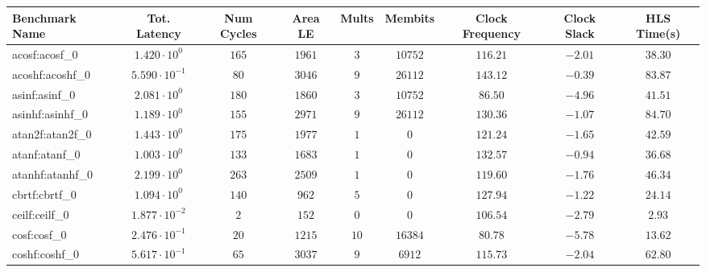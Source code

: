 \begin{tabular}{|l|c|c|c|c|c|c|c|c|}
\hline
Benchmark Name               & Tot. Latency            & Num Cycles & Area LE   & Mults   & Membits    & Clock Frequency & Clock Slack & HLS Time(s) \\
\hline
acosf:acosf\_0               & $ 1.420 \cdot 10^{0}  $ & $ 165    $ & $ 1961  $ & $ 3   $ & $ 10752  $ & $ 116.21      $ & $ -2.01   $ & $ 38.30   $ \\
acoshf:acoshf\_0             & $ 5.590 \cdot 10^{-1} $ & $ 80     $ & $ 3046  $ & $ 9   $ & $ 26112  $ & $ 143.12      $ & $ -0.39   $ & $ 83.87   $ \\
asinf:asinf\_0               & $ 2.081 \cdot 10^{0}  $ & $ 180    $ & $ 1860  $ & $ 3   $ & $ 10752  $ & $ 86.50       $ & $ -4.96   $ & $ 41.51   $ \\
asinhf:asinhf\_0             & $ 1.189 \cdot 10^{0}  $ & $ 155    $ & $ 2971  $ & $ 9   $ & $ 26112  $ & $ 130.36      $ & $ -1.07   $ & $ 84.70   $ \\
atan2f:atan2f\_0             & $ 1.443 \cdot 10^{0}  $ & $ 175    $ & $ 1977  $ & $ 1   $ & $ 0      $ & $ 121.24      $ & $ -1.65   $ & $ 42.59   $ \\
atanf:atanf\_0               & $ 1.003 \cdot 10^{0}  $ & $ 133    $ & $ 1683  $ & $ 1   $ & $ 0      $ & $ 132.57      $ & $ -0.94   $ & $ 36.68   $ \\
atanhf:atanhf\_0             & $ 2.199 \cdot 10^{0}  $ & $ 263    $ & $ 2509  $ & $ 1   $ & $ 0      $ & $ 119.60      $ & $ -1.76   $ & $ 46.34   $ \\
cbrtf:cbrtf\_0               & $ 1.094 \cdot 10^{0}  $ & $ 140    $ & $ 962   $ & $ 5   $ & $ 0      $ & $ 127.94      $ & $ -1.22   $ & $ 24.14   $ \\
ceilf:ceilf\_0               & $ 1.877 \cdot 10^{-2} $ & $ 2      $ & $ 152   $ & $ 0   $ & $ 0      $ & $ 106.54      $ & $ -2.79   $ & $ 2.93    $ \\
cosf:cosf\_0                 & $ 2.476 \cdot 10^{-1} $ & $ 20     $ & $ 1215  $ & $ 10  $ & $ 16384  $ & $ 80.78       $ & $ -5.78   $ & $ 13.62   $ \\
coshf:coshf\_0               & $ 5.617 \cdot 10^{-1} $ & $ 65     $ & $ 3037  $ & $ 9   $ & $ 6912   $ & $ 115.73      $ & $ -2.04   $ & $ 62.80   $ \\

\end{tabular}
